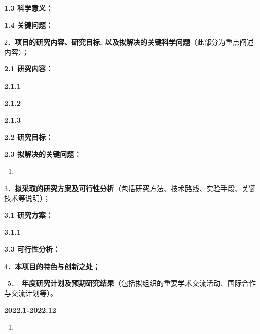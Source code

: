 \documentclass[UTF8,A4]{ctexart}
\newcommand{\blue}{\textcolor[rgb]{0.00,0.44,0.75}}
\begin{document}
\noindent\textbf{1.3 科学意义：}



\noindent\textbf{1.4 关键问题：}



\begin{spacing}{1.2}
 \songti


\end{spacing}
\pagebreak[4]
\begin{spacing}{1.6}
\kaishu\blue{2．\textbf{项目的研究内容、研究目标, 以及拟解决的关键科学问题}（此部分为重点阐述内容）；}
\end{spacing}
\noindent\textbf{2.1 研究内容：}



\noindent\textbf{2.1.1 }



\noindent\textbf{2.1.2}


\noindent\textbf{2.1.3}


\noindent\textbf{2.2 研究目标：}


\noindent\textbf{2.3 拟解决的关键问题：}
\begin{enumerate}
  \item
\end{enumerate}
\pagebreak[4]
\begin{spacing}{1.6}
\kaishu
\blue{3．\textbf{拟采取的研究方案及可行性分析}（包括研究方法、技术路线、实验手段、关键技术等说明）；}
\end{spacing}
\noindent\textbf{3.1 研究方案：}



\noindent\textbf{3.1.1}


\noindent\textbf{3.3 可行性分析：}



\pagebreak[4]
\begin{spacing}{1.6}
\kaishu
\blue{4．\textbf{本项目的特色与创新之处；}}
\end{spacing}



\begin{spacing}{1.6}
\kaishu
\blue{~5．~\textbf{年度研究计划及预期研究结果}（包括拟组织的重要学术交流活动、国际合作与交流计划等）。}
\end{spacing}
\noindent\textbf{2022.1-2022.12}
\begin{enumerate}
  \item
\end{enumerate}
\end{document}

